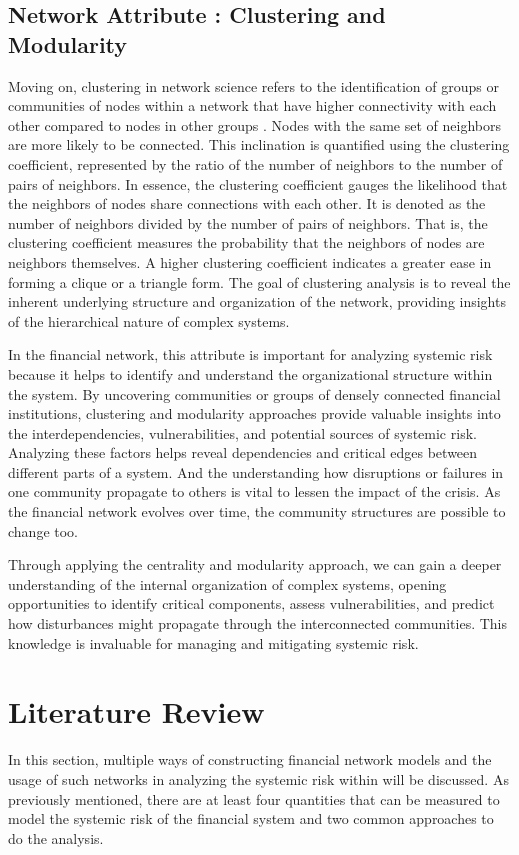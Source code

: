 \documentclass[a4paper,11pt]{article}
\begin{document}
\subsection{Network Attribute : Clustering and Modularity}
Moving on, clustering in network science refers to the identification of groups or communities of nodes within a network that have higher connectivity with each other compared to nodes in other groups \citep{Barabasi_2013}. Nodes with the same set of neighbors are more likely to be connected. This inclination is quantified using the clustering coefficient, represented by the ratio of the number of neighbors to the number of pairs of neighbors. In essence, the clustering coefficient gauges the likelihood that the neighbors of nodes share connections with each other. It is denoted as the number of neighbors divided by the number of pairs of neighbors. That is, the clustering coefficient measures the probability that the neighbors of nodes are neighbors themselves. A higher clustering coefficient indicates a greater ease in forming a clique or a triangle form. The goal of clustering analysis is to reveal the inherent underlying structure and organization of the network, providing insights of the hierarchical nature of complex systems.

In the financial network, this attribute is important for analyzing systemic risk because it helps to identify and understand the organizational structure within the system. By uncovering communities or groups of densely connected financial institutions, clustering and modularity approaches provide valuable insights into the interdependencies, vulnerabilities, and potential sources of systemic risk. Analyzing these factors helps reveal dependencies and critical edges between different parts of a system. And the understanding how disruptions or failures in one community propagate to others is vital to lessen the impact of the crisis. As the financial network evolves over time, the community structures are possible to change too.

Through applying the centrality and modularity approach, we can gain a deeper understanding of the internal organization of complex systems, opening opportunities to identify critical components, assess vulnerabilities, and predict how disturbances might propagate through the interconnected communities. This knowledge is invaluable for managing and mitigating systemic risk.

\section{Literature Review}
In this section, multiple ways of constructing financial network models and the usage of such networks in analyzing the systemic risk within will be discussed. As previously mentioned, there are at least four quantities that can be measured to model the systemic risk of the financial system and two common approaches to do the analysis.
\end{document}
